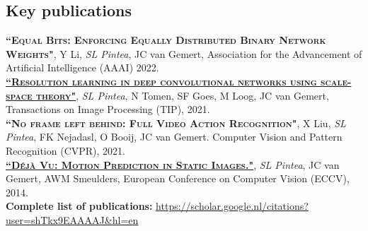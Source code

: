 \documentclass[a4paper, oneside, final]{scrartcl}
\begin{document}
\begin{center}
		\section{Key publications}
        \begin{flushleft}
            \textsc{\textbf{``Equal Bits: Enforcing Equally Distributed Binary Network Weights"}}, Y Li, \emph{SL Pintea}, JC van Gemert, Association for the Advancement of Artificial Intelligence (AAAI) 2022.\\[3px]

            \textsc{\textbf{\href{https://github.com/SilviaLauraPintea/N-JetNet}{``Resolution learning in deep convolutional networks using scale-space theory"}}}, \emph{SL Pintea}, N Tomen, SF Goes, M Loog, JC van Gemert, Transactions on Image Processing (TIP), 2021.\\[3px]
			\textsc{\textbf{``No frame left behind: Full Video Action Recognition"}}, X Liu, \emph{SL Pintea}, FK Nejadasl, O Booij, JC van Gemert. 
            Computer Vision and Pattern Recognition (CVPR), 2021.\\[3px]
            \textsc{\textbf{\href{http://github.com/SilviaLauraPintea/DejaVu}{``D\'{e}j\`{a} Vu: Motion Prediction in Static Images."}}}, \emph{SL Pintea}, JC van Gemert, AWM Smeulders, 
            European Conference on Computer Vision (ECCV), 2014.\\[10px]
            \textbf{Complete list of publications:} \href{https://scholar.google.nl/citations?user=shTkx9EAAAAJ&hl=en}{https://scholar.google.nl/citations?user=shTkx9EAAAAJ\&hl=en}\\
        \end{flushleft}

\end{center}
\end{document}

